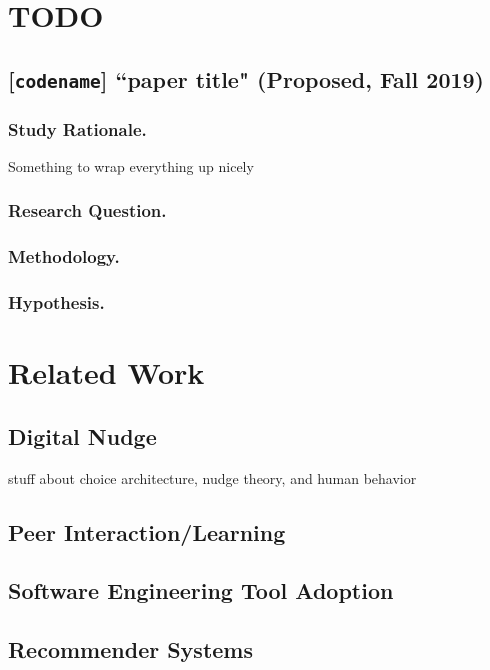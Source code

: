 \documentclass[runningheads]{llncs}
\begin{document}
\section{TODO} 


\subsection{[\texttt{codename}] ``paper title" (Proposed, Fall 2019)}

\subsubsection{Study Rationale.} Something to wrap everything up nicely

\subsubsection{Research Question.}

\subsubsection{Methodology.} 

\subsubsection{Hypothesis.} 

\section{Related Work}

\subsection{Digital Nudge}
stuff about choice architecture, nudge theory, and human behavior

\subsection{Peer Interaction/Learning}

\subsection{Software Engineering Tool Adoption}

\subsection{Recommender Systems}
\end{document}
